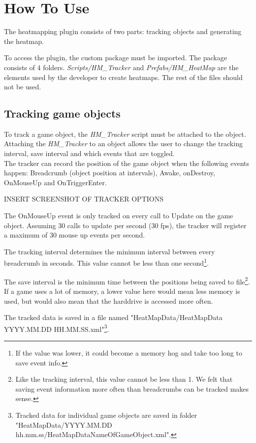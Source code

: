 \section{How To Use}
\label{HowToUse}
The heatmapping plugin consists of two parts: tracking objects and generating the heatmap.

To access the plugin, the custom package must be imported. The package consists of 4 folders. \textit{Scripts/HM\_Tracker} and \textit{Prefabs/HM\_HeatMap} are the elements used by the developer to create heatmaps. The rest of the files should not be used.

\subsection{Tracking game objects}
\label{HowToUse_Tracking}
To track a game object, the \textit{HM\_Tracker} script must be attached to the object. Attaching the \textit{HM\_Tracker} to an object allows the user to change the tracking interval, save interval and which events that are toggled.
\\The tracker can record the position of the game object when the following events happen: Breadcrumb (object position at intervals), Awake, onDestroy, OnMouseUp and OnTriggerEnter.

INSERT SCREENSHOT OF TRACKER OPTIONS

The OnMouseUp event is only tracked on every call to Update on the game object. Assuming 30 calls to update per second (30 fps), the tracker will register a maximum of 30 mouse up events per second.

The tracking interval determines the minimum interval between every breadcrumb in seconds. This value cannot be less than one second\footnote{If the value was lower, it could become a memory hog and take too long to save event info.}.

The save interval is the minimum time between the positions being saved to file\footnote{Like the tracking interval, this value cannot be less than 1. We felt that saving event information more often than breadcrumbs can be tracked makes sense.}. 
If a game uses a lot of memory, a lower value here would mean less memory is used, but would also mean that the harddrive is accessed more often.

The tracked data is saved in a file named "HeatMapData/HeatMapData YYYY.MM.DD HH.MM.SS.xml"\footnote{Tracked data for individual game objects are saved in folder "HeatMapData/YYYY.MM.DD hh.mm.ss/HeatMapDataNameOfGameObject.xml".}.

